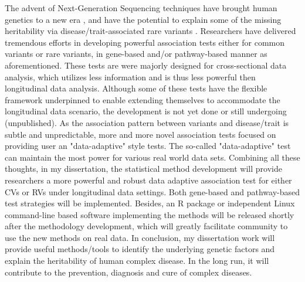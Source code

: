 \documentclass[12pt]{article}
\begin{document}
The advent of Next-Generation Sequencing techniques have brought human genetics to a new era \cite{Ansorge2009,Metzker2009,Mardis2008,Shendure2008}, and have the potential to explain some of the missing heritability via disease/trait-associated rare variants \cite{Eichler2010}. Researchers have delivered tremendous efforts in developing powerful association tests either for common variants or rare variants, in gene-based and/or pathway-based manner as aforementioned. These tests are were majorly designed for cross-sectional data analysis, which utilizes less information and is thus less powerful then longitudinal data analysis. Although some of these tests have the flexible framework underpinned to enable extending themselves to accommodate the longitudinal data scenario, the development is not yet done or still undergoing (unpublished). As the association pattern between variants and disease/trait is subtle and unpredictable, more and more novel association tests focused on providing user an "data-adaptive" style tests. The so-called "data-adaptive" test can maintain the most power for various real world data sets. Combining all these thoughts, in my dissertation, the statistical method development will provide researchers a more powerful and robust data adaptive association test for either CVs or RVs under longitudinal data settings. Both gene-based and pathway-based test strategies will be implemented. Besides, an R package or independent Linux command-line based software implementing the methods will be released shortly after the methodology development, which will greatly facilitate community to use the new methods on real data. In conclusion, my dissertation work will provide useful methods/tools to identify the underlying genetic factors and explain the heritability of human complex disease. In the long run, it will contribute to the prevention, diagnosis and cure of complex diseases.
\end{document}
